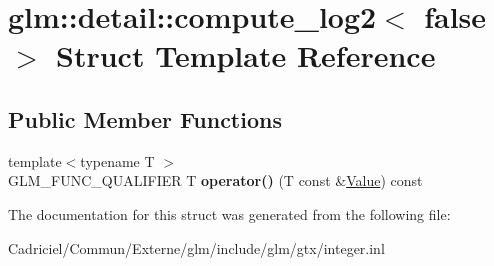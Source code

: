 \hypertarget{structglm_1_1detail_1_1compute__log2_3_01false_01_4}{}\section{glm\+:\+:detail\+:\+:compute\+\_\+log2$<$ false $>$ Struct Template Reference}
\label{structglm_1_1detail_1_1compute__log2_3_01false_01_4}
\subsection*{Public Member Functions}
\begin{DoxyCompactItemize}
\item 
{\footnotesize template$<$typename T $>$ }\\G\+L\+M\+\_\+\+F\+U\+N\+C\+\_\+\+Q\+U\+A\+L\+I\+F\+I\+ER T {\bfseries operator()} (T const \&\hyperlink{document_8h_a071cf97155ba72ac9a1fc4ad7e63d481}{Value}) const \hypertarget{structglm_1_1detail_1_1compute__log2_3_01false_01_4_a8aef11c23abbfbc89222dfc5f2ffd260}{}\label{structglm_1_1detail_1_1compute__log2_3_01false_01_4_a8aef11c23abbfbc89222dfc5f2ffd260}

\end{DoxyCompactItemize}


The documentation for this struct was generated from the following file\+:\begin{DoxyCompactItemize}
\item 
Cadriciel/\+Commun/\+Externe/glm/include/glm/gtx/integer.\+inl\end{DoxyCompactItemize}
